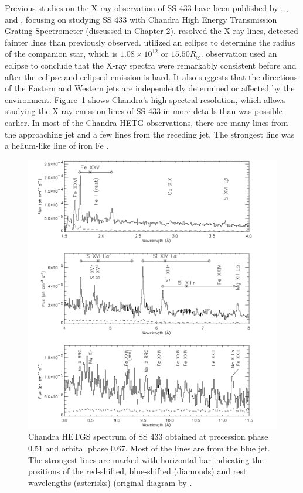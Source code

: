 Previous studies on the X-ray observation of SS 433 have been published by \cite{Marshall2002}, \cite{Lopez2006}, and \cite{Marshall2013}, focusing on studying SS 433 with Chandra High Energy Transmission Grating Spectrometer (discussed in Chapter 2). \cite{Marshall2002} resolved the X-ray lines, detected fainter lines than previously observed. \cite{Lopez2006} utilized an eclipse to determine the radius of the companion star, which is $1.08 \times 10^{12} $ or $15.50 R_{\odot}$. \cite{Marshall2013} observation used an eclipse to conclude that the X-ray spectra were remarkably consistent before and after the eclipse and eclipsed emission is hard. It also suggests that the directions of the Eastern and Western jets are independently determined or affected by the environment. Figure~\ref{HETG2002} shows Chandra's high spectral resolution, which allows studying the X-ray emission lines of SS 433 in more details than was possible earlier. In most of the Chandra HETG observations, there are many lines from the approaching jet and a few lines from the receding jet. The strongest line was a helium-like line of iron Fe  \citep{Marshall2002, Marshall2013}.


\begin{figure}[h!]
    \centering
    \includegraphics[width = \linewidth]{Chapters/Figures/HETG2002.png}
    \caption{Chandra HETGS spectrum of SS 433 obtained at precession phase 0.51 and orbital phase 0.67. Most of the lines are from the blue jet. The strongest lines are marked with horizontal bar indicating the positions of the red-shifted, blue-shifted (diamonds) and rest wavelengths (asterisks) (original diagram by \citep{Marshall2002}.}
    \label{HETG2002}
\end{figure}

